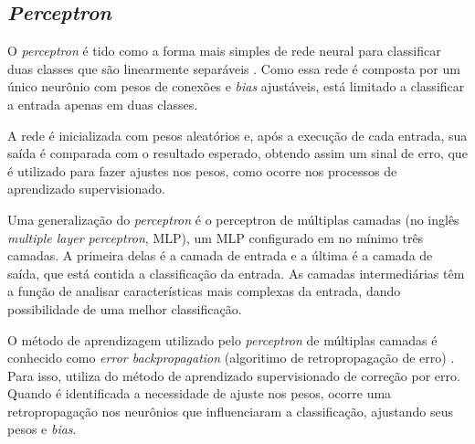 \subsection{\textit{Perceptron}}
O \textit{perceptron} é tido como a forma mais simples de rede neural para classificar duas classes que são linearmente separáveis \cite{haykin2001}. Como essa rede é composta por um único neurônio com pesos de conexões e \textit{bias} ajustáveis, está limitado a classificar a entrada apenas em duas classes. 
\par A rede é inicializada com pesos aleatórios e, após a execução de cada entrada, sua saída é comparada com o resultado esperado, obtendo assim um sinal de erro, que é utilizado para fazer ajustes nos pesos, como ocorre nos processos de aprendizado supervisionado.
\par Uma generalização do \textit{perceptron} é o perceptron de múltiplas camadas (no inglês \textit{multiple layer perceptron}, MLP), um MLP configurado em no mínimo três camadas. A primeira delas é a camada de entrada e a última é a camada de saída, que está contida a classificação da entrada. As camadas intermediárias têm a função de analisar características mais complexas da entrada, dando possibilidade de uma melhor classificação.
\par O método de aprendizagem utilizado pelo \textit{perceptron} de múltiplas camadas é conhecido como \textit{error backpropagation} (algoritimo de retropropagação de erro) \cite{haykin2001}. Para isso, utiliza do método de aprendizado supervisionado de correção por erro. Quando é identificada a necessidade de ajuste nos pesos, ocorre uma 
retropropagação nos neurônios que influenciaram a classificação, ajustando seus pesos 
e \textit{bias}.
